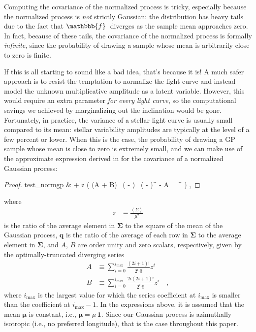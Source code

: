\documentclass[modern]{aastex62}
\begin{document}
Computing the covariance of the normalized process is tricky, especially
because the normalized process is \emph{not} strictly Gaussian: the distribution
has heavy tails due to the fact that $\tilde{\mathbbb{f}\hspace{0.2em}}$ diverges as
the sample mean approaches zero. In fact, because of these tails, the covariance
of the normalized process is formally \emph{infinite}, since the probability of
drawing a sample whose mean is arbitrarily close to zero is finite.

If this is all starting to sound like a bad idea, that's because it is!
A much safer approach is to resist the temptation to normalize the light curve
and instead model the unknown multiplicative amplitude as a latent variable. However,
this would require an extra parameter \emph{for every light curve}, so the
computational savings we achieved by marginalizing out the inclination
would be gone. Fortunately, in practice, the variance of a stellar light curve
is usually small compared to its mean: stellar variability amplitudes are
typically at the level of a few percent or lower. When this is the case,
the probability of drawing a GP sample whose mean is close to zero is
extremely small, and we can make use of the approximate expression derived
in \citet{Luger2020} for the covariance of a normalized Gaussian process:
%
\begin{proof}{test_normgp}
    \label{eq:SigmaTilde}
    \tilde{\pmb{\Sigma}}
    & \approx
     \pmb{\Sigma} +
    z \Big(
    (A + B) \, ( - ) \, ( - )^\top
    - A \,  \, ^\top
    \Big)
    \quad,
\end{proof}
%
where
%
\begin{align}
    \label{eq:z}
    z & \equiv \frac{\left< \Sigma \right>}{\mu^2}
\end{align}
%
is the ratio of the average element in $\pmb{\Sigma}$
to the square of the mean of the Gaussian process,
$\mathbf{q}$ is the ratio of the average of each row in $\pmb{\Sigma}$
to the average element in $\pmb{\Sigma}$, and $A$, $B$ are
order unity and zero scalars, respectively,
given by the optimally-truncated diverging series
%
\begin{align}
    \label{eq:baseline_alpha}
    A
     & \equiv
    \sum\limits_{i=0}^{i_\mathrm{max}}
    \frac{(2i + 1)!}{2^i \, i!}
    z^i
    \\[1em]
    \label{eq:baseline_beta}
    B
     & \equiv
    \sum\limits_{i=0}^{i_\mathrm{max}}
    \frac{2i(2i + 1)!}{2^i \, i!}
    z^i
    \quad,
\end{align}
%
where $i_\mathrm{max}$ is the largest value for which the series coefficient at $i_\mathrm{max}$ is
smaller than the coefficient at $i_\mathrm{max} - 1$. In the expressions above, it is
assumed that the mean $\pmb{\mu}$ is constant, i.e., $\pmb{\mu} = \mu\, \mathbf{1}$.
Since our Gaussian process is azimuthally isotropic (i.e., no preferred
longitude), that is the case throughout this paper.
\end{document}
